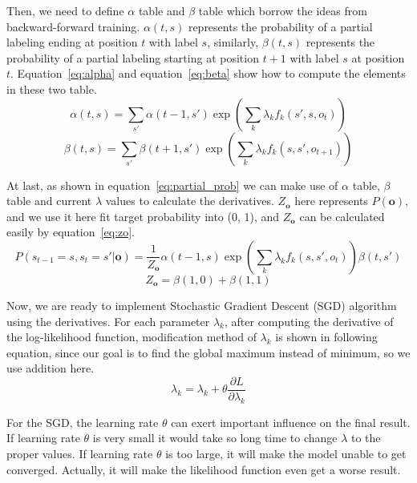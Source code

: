 \documentclass[UTF8,11pt]{article}
\begin{document}
Then, we need to define $\alpha$ table and $\beta$ table which borrow the ideas from backward-forward training. $\alpha(t, s)$ represents the probability of a partial labeling ending at position $t$ with label $s$, similarly, $\beta(t, s)$ represents the probability of a partial labeling starting at position $t+1$ with label $s$ at position $t$. Equation~\ref{eq:alpha} and equation~\ref{eq:beta} show how to compute the elements in these two table.
\begin{equation} \label{eq:alpha}
    \alpha(t, s) = \sum_{s'} \alpha(t-1, s') \exp \left( \sum_k \lambda_k f_k(s', s, o_t) \right)
\end{equation}
\begin{equation} \label{eq:beta}
    \beta(t, s) = \sum_{s'} \beta(t+1, s') \exp \left( \sum_k \lambda_k f_k(s, s', o_{t+1}) \right)
\end{equation}

At last, as shown in equation~\ref{eq:partial_prob} we can make use of $\alpha$ table, $\beta$ table and current $\lambda$ values to calculate the derivatives. $Z_{\mathbf{o}}$ here represents $P(\mathbf{o})$, and we use it here fit target probability into (0, 1), and $Z_{\mathbf{o}}$ can be calculated easily by equation~\ref{eq:zo}.
\begin{equation} \label{eq:partial_prob}
    P(s_{t-1} = s, s_{t} = s'|\mathbf{o}) = \frac{1}{Z_{\mathbf{o}}} \alpha(t-1, s) \exp \left( \sum_k \lambda_k f_k(s, s', o_t) \right) \beta(t, s')
\end{equation}
\begin{equation} \label{eq:zo}
     Z_{\mathbf{o}} = \beta(1, 0) + \beta(1, 1)
\end{equation}

Now, we are ready to implement Stochastic Gradient Descent (SGD) algorithm using the derivatives. For each parameter $\lambda_k$, after computing the derivative of the log-likelihood function, modification method of $\lambda_k$ is shown in following equation, since our goal is to find the global maximum instead of minimum, so we use addition here.
\begin{equation} \label{eq:sgd_update}
    \lambda_k = \lambda_k + \theta \frac{\partial L}{\partial \lambda_k}
\end{equation}

For the SGD, the learning rate $\theta$ can exert important influence on the final result. If learning rate $\theta$ is very small it would take so long time to change $\lambda$ to the proper values. If learning rate $\theta$ is too large, it will make the model unable to get converged. Actually, it will make the likelihood function even get a worse result.
\end{document}
